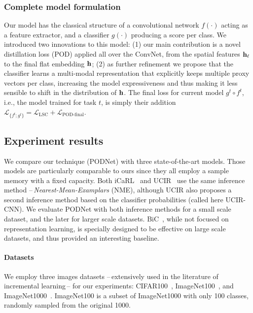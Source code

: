 \subsubsection{Complete model formulation}

Our model has the classical structure of a convolutional network $f(\cdot)$ acting as a feature
extractor, and a classifier $g(\cdot)$ producing a score per class. We introduced two innovations to
this model: (1) our main contribution is a novel distillation loss (POD) applied all over the
ConvNet, from the spatial features $\mathbf{h}_\ell$ to the final flat embedding $\mathbf{h}$; (2) as further
refinement we propose that the classifier learns a multi-modal representation that explicitly keeps
multiple proxy vectors per class, increasing the model expressiveness and thus making it less
sensible to shift in the distribution of $\mathbf{h}$. The final loss for current model $g^t \circ f^t$,
i.e., the model trained for task $t$, is simply their addition $\mathcal{L}_{\{f^t; g^t\}} =
    \mathcal{L}_\textrm{LSC} + \mathcal{L}_\textrm{POD-final}$.

\subsection{Experiment results}


We compare our technique (PODNet) with three state-of-the-art models. Those models are particularly
comparable to ours since they all employ a sample memory with a fixed capacity. Both
iCaRL~\citep{rebuffi2017icarl} and UCIR~\citep{hou2019ucir} use the same inference method
--\,\textit{Nearest-Mean-Examplars} (NME), although UCIR also proposes a second inference method
based on the classifier probabilities (called here UCIR-CNN). We evaluate PODNet with both inference
methods for a small scale dataset, and the later for larger scale datasets.
BiC~\citep{wu2019bias_correction}, while not focused on representation learning, is specially
designed to be effective on large scale datasets, and thus provided an interesting baseline.

\paragraph{Datasets} We employ three images datasets --\,extensively used in the literature of
incremental learning\,-- for our experiments: CIFAR100~\citep{krizhevskycifar100},
ImageNet100~\citep{deng2009imagenet,hou2019ucir,wu2019bias_correction}, and
ImageNet1000~\citep{deng2009imagenet}. ImageNet100 is a subset of ImageNet1000 with only 100
classes, randomly sampled from the original 1000.


